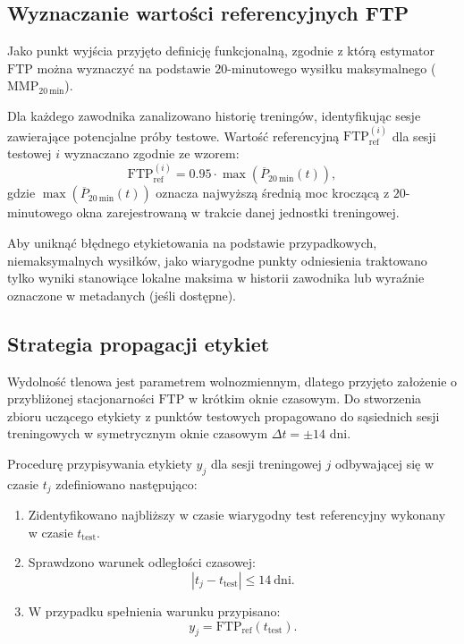 \subsection{Wyznaczanie wartości referencyjnych FTP}

Jako punkt wyjścia przyjęto definicję funkcjonalną, zgodnie z którą estymator $\mathrm{FTP}$ można wyznaczyć na podstawie $20$-minutowego wysiłku maksymalnego ($\mathrm{MMP}_{20\ \mathrm{min}}$).

Dla każdego zawodnika zanalizowano historię treningów, identyfikując sesje zawierające potencjalne próby testowe.
Wartość referencyjną $\mathrm{FTP}_{\mathrm{ref}}^{(i)}$ dla sesji testowej $i$ wyznaczano zgodnie ze wzorem:
\begin{equation}
\label{eq:ftp_ref_mmp20}
\mathrm{FTP}_{\mathrm{ref}}^{(i)} = 0.95 \cdot \max\!\left(\overline{P}_{20\ \mathrm{min}}(t)\right),
\end{equation}
gdzie $\max(\overline{P}_{20\ \mathrm{min}}(t))$ oznacza najwyższą średnią moc kroczącą z $20$-minutowego okna zarejestrowaną w trakcie danej jednostki treningowej.

Aby uniknąć błędnego etykietowania na podstawie przypadkowych, niemaksymalnych wysiłków, jako wiarygodne punkty odniesienia traktowano tylko wyniki stanowiące lokalne maksima w historii zawodnika lub wyraźnie oznaczone w metadanych (jeśli dostępne).

\subsection{Strategia propagacji etykiet}

Wydolność tlenowa jest parametrem wolnozmiennym, dlatego przyjęto założenie o przybliżonej stacjonarności $\mathrm{FTP}$ w krótkim oknie czasowym.
Do stworzenia zbioru uczącego etykiety z punktów testowych propagowano do sąsiednich sesji treningowych w symetrycznym oknie czasowym $\Delta t = \pm 14$ dni.

Procedurę przypisywania etykiety $y_j$ dla sesji treningowej $j$ odbywającej się w czasie $t_j$ zdefiniowano następująco:
\begin{enumerate}
  \item Zidentyfikowano najbliższy w czasie wiarygodny test referencyjny wykonany w czasie $t_{\mathrm{test}}$.
  \item Sprawdzono warunek odległości czasowej:
  \[
    \left|t_j - t_{\mathrm{test}}\right| \le 14\ \text{dni}.
  \]
  \item W przypadku spełnienia warunku przypisano:
  \[
    y_j = \mathrm{FTP}_{\mathrm{ref}}(t_{\mathrm{test}}).
  \]
\end{enumerate}

